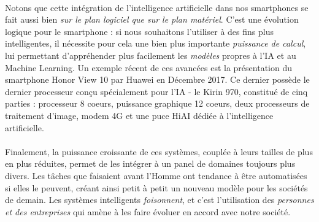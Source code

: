 \paragraph{} Notons que cette intégration de l'intelligence artificielle dans nos smartphones se fait aussi bien \emph{sur le plan logiciel que
sur le plan matériel}. C'est une évolution logique pour le smartphone : si nous souhaitons l'utiliser à des fins plus intelligentes, il nécessite
pour cela une bien plus importante \emph{puissance de calcul}, lui permettant d'appréhender plus facilement les \emph{modèles} propres à l'IA et au
Machine Learning. Un exemple récent de ces avancées est la présentation du smartphone Honor View 10 par Huawei en Décembre 2017. \cite{Smartphone1}
Ce dernier possède le dernier processeur conçu spécialement pour l'IA - le Kirin 970, constitué de cinq parties : processeur 8 coeurs, puissance
graphique 12 coeurs, deux processeurs de traitement d'image, modem 4G et une puce HiAI dédiée à l'intelligence artificielle.

\paragraph{} Finalement, la puissance croissante de ces systèmes, couplée à leurs tailles de plus en plus réduites, permet de les intégrer à un
panel de domaines toujours plus divers. Les tâches que faisaient avant l'Homme ont tendance à être automatisées si elles le peuvent, créant 
ainsi petit à petit un nouveau modèle pour les sociétés de demain. Les systèmes intelligents \emph{foisonnent}, et c'est l'utilisation des
\emph{personnes et des entreprises} qui amène à les faire évoluer en accord avec notre société. 
